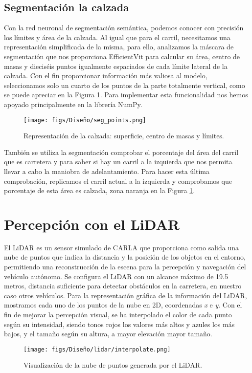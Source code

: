 \subsection{Segmentación la calzada}

Con la red neuronal de segmentación semántica, podemos conocer con precisión los límites y área de la calzada. Al igual que para el carril, necesitamos una representación simplificada de la misma, para ello, analizamos la máscara de segmentación que nos proporciona EfficientVit para calcular su área, centro de masas y dieciséis puntos igualmente espaciados de cada límite lateral de la calzada. Con el fin proporcionar información más valiosa al modelo, seleccionamos solo un cuarto de los puntos de la parte totalmente vertical, como se puede apreciar en la Figura \ref{fig:seg_params}. Para implementar esta funcionalidad nos hemos apoyado principalmente en la librería NumPy.

\begin{figure}[ht]
  \centering
  \texttt{[image: figs/Diseño/seg\_points.png]}
  \caption{Representación de la calzada: superficie, centro de masas y límites.}
  \label{fig:seg_params}
\end{figure}

También se utiliza la segmentación comprobar el porcentaje del área del carril que es carretera y para saber si hay un carril a la izquierda que nos permita llevar a cabo la maniobra de adelantamiento. Para hacer esta última comprobación, replicamos el carril actual a la izquierda y comprobamos que porcentaje de esta área es calzada, zona naranja en la Figura \ref{fig:seg_params}.

\section{Percepción con el \ac{LiDAR}}

El \ac{LiDAR} es un sensor simulado de CARLA que proporciona como salida una nube de puntos que indica la distancia y la posición de los objetos en el entorno, permitiendo una reconstrucción de la escena para la percepción y navegación del vehículo autónomo. Se configura el \ac{LiDAR} con un alcance máximo de 19.5 metros, distancia suficiente para detectar obstáculos en la carretera, en nuestro caso otros vehículos. Para la representación gráfica de la información del \ac{LiDAR}, mostramos cada uno de los puntos de la nube en 2D, coordenadas \textit{x} e \textit{y}. Con el fin de mejorar la percepción visual, se ha interpolado el color de cada punto según su intensidad, siendo tonos rojos los valores más altos y azules los más bajos, y el tamaño según su altura, a mayor elevación mayor tamaño.
\begin{figure}[ht]
  \centering
  \texttt{[image: figs/Diseño/lidar/interpolate.png]}
  \caption{Visualización de la nube de puntos generada por el \ac{LiDAR}.}
  \label{fig:interpolate_lidar}
\end{figure}

